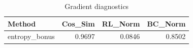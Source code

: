 \begin{table}[htbp]
\centering
\caption{Gradient diagnostics}
\label{tab:grad-diag}
\begin{tabular}{lrrr}
\toprule
\textbf{Method} & \textbf{Cos\_Sim} & \textbf{RL\_Norm} & \textbf{BC\_Norm} \\
\midrule
entropy\_bonus & 0.9697 & 0.0846 & 0.8502 \\
\bottomrule
\end{tabular}
\end{table}
